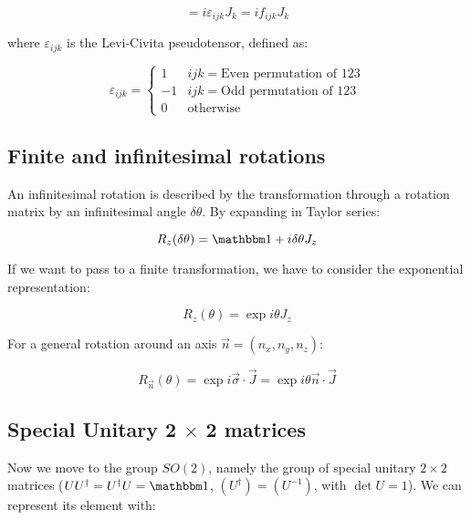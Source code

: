 \documentclass[../../main/main.tex]{subfiles}
\begin{document}
\begin{equation}
	[J_i, J_j] = i \varepsilon_{ijk} J_k = i f_{ijk} J_k
\end{equation}

where $\varepsilon_{ijk}$ is the Levi-Civita pseudotensor, defined as:

\begin{equation}
	\varepsilon_{ijk} =
	\begin{cases}
		1	&	ijk=\text{Even permutation of 123}	\\
		-1	&	ijk=\text{Odd permutation of 123}	\\
		0	&	\text{otherwise}
	\end{cases}
\end{equation}



\subsection{Finite and infinitesimal rotations}
An infinitesimal rotation is described by the transformation through a rotation matrix by an infinitesimal angle $\delta \theta$. By expanding in Taylor series:

\begin{equation}
	R_z(\delta \theta) = \id + i \delta \theta J_z
\end{equation}

If we want to pass to a finite transformation, we have to consider the exponential representation:

\begin{equation}
	R_z(\theta) = \exp{i \theta J_z}
\end{equation}

For a general rotation around an axis $\vec{n} = (n_x, n_y, n_z)$:

\begin{equation}
	R_{\vec{n}}(\theta) = \exp{i \vec{\sigma} \cdot \vec{J}} = \exp{i \theta \vec{n} \cdot \vec{J}}
\end{equation}




\subsection{Special Unitary 2 $\times$ 2 matrices}
Now we move to the group $SO(2)$, namely the group of special unitary $2 \times 2$ matrices ($UU^{\dagger} = U^{\dagger}U = \id$, $(U^{\dagger}) = (U^{-1})$, with $\det{U} = 1$). We can represent its element with:
\end{document}
